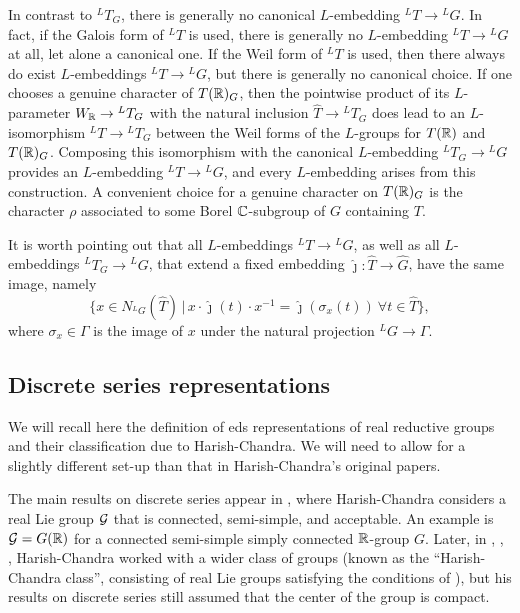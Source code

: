 \documentclass{article}
\theoremstyle{definition}
\numberwithin{equation}{section}
\renewcommand{\-}{\hyp{}}
\begin{document}
In contrast to $^LT_G$, there is generally no canonical $L$\-embedding $^LT \to {^LG}$. In fact, if the Galois form of $^LT$ is used, there is generally no $L$\-embedding $^LT \to {^LG}$ at all, let alone a canonical one. If the Weil form of $^LT$ is used, then there always do exist $L$\-embeddings $^LT \to {^LG}$, but there is generally no canonical choice. If one chooses a genuine character of $T(\mathbb{R})_G$, then the pointwise product of its $L$\-parameter $W_{\mathbb{R}} \to {^LT_G}$ with the natural inclusion $\hat T \to {^LT_G}$ does lead to an $L$\-isomorphism $^LT \to {^LT_G}$ between the Weil forms of the $L$\-groups for $T(\mathbb{R})$ and $T(\mathbb{R})_G$. Composing this isomorphism with the canonical $L$\-embedding $^LT_G \to {^LG}$ provides an $L$\-embedding $^LT \to {^LG}$, and every $L$\-embedding arises from this construction. A convenient choice for a genuine character on $T(\mathbb{R})_G$ is the character $\rho$ associated to some Borel $\mathbb{C}$-subgroup of $G$ containing $T$.

It is worth pointing out that all $L$\-embeddings $^LT \to {^LG}$, as well as all $L$\-embeddings $^LT_G \to {^LG}$, that extend a fixed embedding $\hat\jmath : \hat T \to \hat G$, have the same image, namely
\begin{equation} \label{eq:lembim}
\{x \in N_{^LG}(\hat T)\,|\, x\cdot\hat\jmath(t)\cdot x^{-1} = \hat\jmath(\sigma_x(t))\ \forall t \in \hat T\},
\end{equation}
where $\sigma_x \in \Gamma$ is the image of $x$ under the natural projection $^LG \to \Gamma$.


\subsection{Discrete series representations} \label{sub:essds}

We will recall here the definition of eds representations of real reductive groups and their classification due to Harish-Chandra. We will need to allow for a slightly different set-up than that in Harish-Chandra's original papers.

The main results on discrete series appear in \cite{HCDSI}, where Harish-Chandra considers a real Lie group $\mathcal{G}$ that is connected, semi-simple, and acceptable. An example is $\mathcal{G}=G(\mathbb{R})$ for a connected semi-simple simply connected $\mathbb{R}$-group $G$. Later, in \cite{HC-R1}, \cite{HC-R2}, \cite{HC-R3}, Harish-Chandra worked with a wider class of groups (known as the ``Harish-Chandra class'', consisting of real Lie groups satisfying the conditions of \cite[\S3]{HC-R1}), but his results on discrete series still assumed that the center of the group is compact. 
\end{document}
